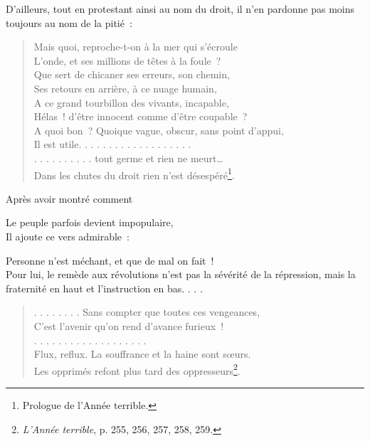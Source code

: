 \documentclass[french,twoside]{book} %
\begin{document}
\noindent D’ailleurs, tout en protestant ainsi au nom du droit, il n’en pardonne pas moins toujours au nom de la pitié :\par


\begin{verse}
Mais quoi, reproche-t-on à la mer qui s’écroule\\
L’onde, et ses millions de têtes à la foule ?\\
Que sert de chicaner ses erreurs, son chemin,\\
Ses retours en arrière, à ce nuage humain,\\
A ce grand tourbillon des vivants, incapable,\\
Hélas ! d’être innocent comme d’être coupable ?\\
A quoi bon ? Quoique vague, obscur, sans point d’appui,\\
Il est utile. . . . . . . . . . . . . . . . . . .\\
. . . . . . . . . . tout germe et rien ne meurt…\\
Dans les chutes du droit rien n’est désespéré\footnote{Prologue de l’Année terrible.}.\\
\end{verse}

\noindent Après avoir montré comment\par

Le peuple parfois devient impopulaire,\\

\noindent Il ajoute ce vers admirable :\par

Personne n’est méchant, et que de mal on fait !\\

\noindent Pour lui, le remède aux révolutions n’est pas la sévérité de la répression, mais la fraternité en haut et l’instruction en bas. . . .\par


\begin{verse}
. . . . . . . . Sans compter que toutes ces vengeances,\\
C’est l’avenir qu’on rend d’avance furieux !\\
. . . . . . . . . . . . . . . . . . .\\
Flux, reflux. La souffrance et la haine sont sœurs.\\
Les opprimés refont plus tard des oppresseurs\footnote{\emph{L’Année terrible}, p. 255, 256, 257, 258, 259.}.\\
\end{verse}
\end{document}
